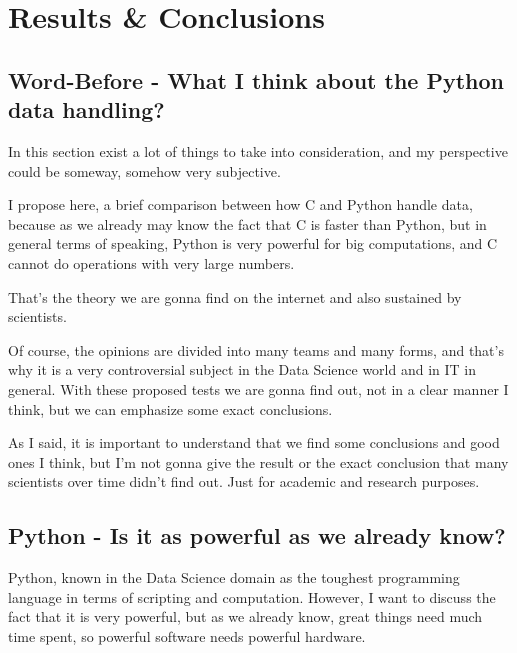 \documentclass{article}%
\begin{document}
        \vspace*{\fill}
              \section{Results \& Conclusions}          
               \vspace{0.2cm}
            \subsection{Word-Before - What I think about the Python data handling?} 
                        
            In this section exist a lot of things to take into consideration, and my perspective could be someway, somehow very subjective.
            
            I propose here, a brief comparison between how C and Python handle data, because as we already may know the fact that C is faster 
            than Python, but in general terms of speaking, Python is very powerful for big computations, and C cannot do operations with very large numbers.
                        
            That's the theory we are gonna find on the internet and also sustained by scientists.
                        
            Of course, the opinions are divided into many teams and many forms, and that's why it is a very controversial subject in the Data Science world and in IT in general.
            With these proposed tests we are gonna find out, not in a clear manner I think, but we can emphasize some exact conclusions.
                        
            As I said, it is important to understand that we find some conclusions and good ones I think, but I'm not gonna give the result or the exact 
            conclusion that many scientists over time didn't find out. Just for academic and research purposes.
                        
            \subsection{Python - Is it as powerful as we already know?}
                        
            Python, known in the Data Science domain as the toughest programming language in terms of scripting and computation.
            However, I want to discuss the fact that it is very powerful, but as we already know, great things need much time spent, so powerful software needs powerful hardware.
                        
\end{document}
